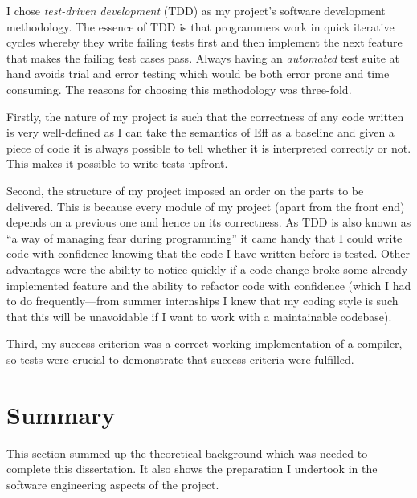\documentclass[class=article, crop=false]{standalone}
\begin{document}
I chose \emph{test-driven development} (TDD) \cite{beck2003test} as my project's
software development methodology. The essence of TDD is that programmers work in
quick iterative cycles whereby they write failing tests first and then implement
the next feature that makes the failing test cases pass. Always having an
\emph{automated} test suite at hand avoids trial and error testing which would
be both error prone and time consuming. The reasons for choosing this
methodology was three-fold.

Firstly, the nature of my project is such that the correctness of any code
written is very well-defined as I can take the semantics of Eff as a baseline
and given a piece of code it is always possible to tell whether it is
interpreted correctly or not. This makes it possible to write tests upfront.

Second, the structure of my project imposed an order on the parts to be
delivered. This is because every module of my project (apart from the front end)
depends on a previous one and hence on its correctness. As TDD is also known as 
``a way of managing fear during programming'' it came handy that I could write
code with confidence knowing that the code I have written before is tested.
Other advantages were the ability to notice quickly if a code change broke some
already implemented feature and the ability to refactor code with confidence
(which I had to do frequently---from summer internships I knew that my coding
style is such that this will be unavoidable if I want to work with a
maintainable codebase).

Third, my success criterion was a correct working implementation of a compiler,
so tests were crucial to demonstrate that success criteria were fulfilled.

\section{Summary}
This section summed up the theoretical background which was needed to complete
this dissertation. It also shows the preparation I undertook in the software
engineering aspects of the project.
\end{document}
